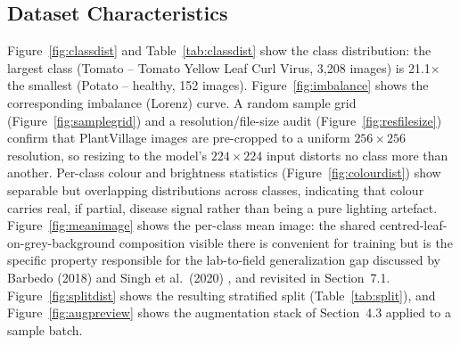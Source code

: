 \documentclass[12pt,a4paper]{article}
\begin{document}
\subsection{Dataset Characteristics}
Figure~\ref{fig:classdist} and Table~\ref{tab:classdist} show the class
distribution: the largest class (Tomato -- Tomato Yellow Leaf Curl Virus,
3{,}208 images) is 21.1$\times$ the smallest (Potato -- healthy, 152 images).
Figure~\ref{fig:imbalance} shows the corresponding imbalance (Lorenz) curve.
A random sample grid (Figure~\ref{fig:samplegrid}) and a resolution/file-size
audit (Figure~\ref{fig:resfilesize}) confirm that PlantVillage images are
pre-cropped to a uniform $256\times256$ resolution, so resizing to the
model's $224\times224$ input distorts no class more than another.
Per-class colour and brightness statistics (Figure~\ref{fig:colourdist}) show
separable but overlapping distributions across classes, indicating that
colour carries real, if partial, disease signal rather than being a pure
lighting artefact. Figure~\ref{fig:meanimage} shows the per-class mean image:
the shared centred-leaf-on-grey-background composition visible there is
convenient for training but is the specific property responsible for the
lab-to-field generalization gap discussed by Barbedo (2018)
\cite{barbedo2018} and Singh et al.\ (2020) \cite{singh2020plantdoc}, and
revisited in Section~7.1. Figure~\ref{fig:splitdist} shows the resulting
stratified split (Table~\ref{tab:split}), and Figure~\ref{fig:augpreview}
shows the augmentation stack of Section~4.3 applied to a sample batch.
\end{document}
